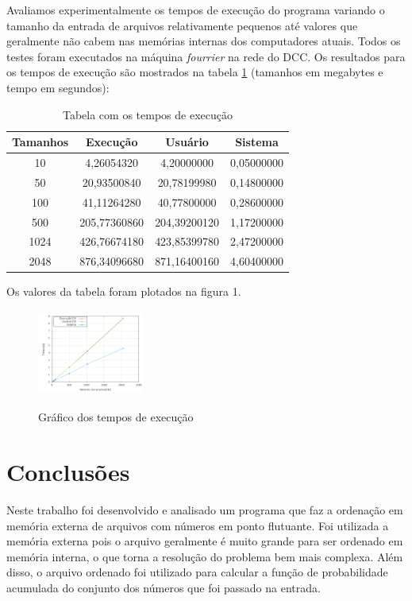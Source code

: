 \documentclass[12pt]{article}
\begin{document}
Avaliamos experimentalmente os tempos de execução do programa variando o tamanho da entrada
de arquivos relativamente pequenos até valores que geralmente não cabem nas memórias internas 
dos computadores atuais. Todos os testes foram executados na máquina \textit{fourrier} na rede 
do DCC. Os resultados para os tempos de execução são mostrados na tabela \ref{tempossss} (tamanhos em megabytes 
e tempo em segundos):

\begin{table}[htb]
\centering
\caption{Tabela com os tempos de execução}
\label{tempossss}
\begin{tabular}{|c|c|c|c|}
\hline Tamanhos & Execução & Usuário & Sistema \\ 
\hline 10 & 4,26054320
 & 4,20000000
 & 0,05000000
 \\ 
\hline 50 & 20,93500840
 & 20,78199980
 & 0,14800000
 \\ 
\hline 100 & 41,11264280
 & 40,77800000
 & 0,28600000
 \\ 
\hline 500 & 205,77360860
 & 204,39200120
 & 1,17200000
 \\ 
\hline 1024 & 426,76674180
 & 423,85399780
 & 2,47200000
 \\ 
\hline 2048 & 876,34096680
 & 871,16400160
 & 4,60400000
 \\ 
\hline
\end{tabular} 
\end{table}

Os valores da tabela foram plotados na figura 1.

\begin{figure}[ht!]
\centering
\includegraphics[width=3.5cm,height=2.8cm]{avaliacoes/testes.png}
\label{img:resss}
\caption{Gráfico dos tempos de execução}
\end{figure}

\section{Conclusões}
\label{conclusao}

Neste trabalho foi desenvolvido e analisado um programa que faz a ordenação em memória 
externa de arquivos com números em ponto flutuante. Foi utilizada a memória externa pois o arquivo
geralmente é muito grande para ser ordenado em memória interna, o que torna a resolução do problema
bem mais complexa. Além disso, o arquivo ordenado foi utilizado para calcular a função de probabilidade acumulada do conjunto dos números que foi passado na entrada.
\end{document}
